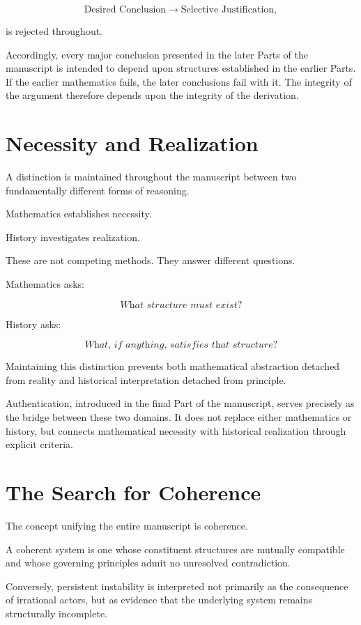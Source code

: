 \documentclass[11pt,openany]{book}
\theoremstyle{plain}
\theoremstyle{definition}
\begin{document}
\[
\boxed{
\text{Desired Conclusion}
\longrightarrow
\text{Selective Justification},
}
\]

is rejected throughout.

Accordingly, every major conclusion presented in the later Parts of the manuscript is intended to depend upon structures established in the earlier Parts. If the earlier mathematics fails, the later conclusions fail with it. The integrity of the argument therefore depends upon the integrity of the derivation.

\section*{Necessity and Realization}

A distinction is maintained throughout the manuscript between two fundamentally different forms of reasoning.

Mathematics establishes necessity.

History investigates realization.

These are not competing methods. They answer different questions.

Mathematics asks:

\[
\textit{What structure must exist?}
\]

History asks:

\[
\textit{What, if anything, satisfies that structure?}
\]

Maintaining this distinction prevents both mathematical abstraction detached from reality and historical interpretation detached from principle.

Authentication, introduced in the final Part of the manuscript, serves precisely as the bridge between these two domains. It does not replace either mathematics or history, but connects mathematical necessity with historical realization through explicit criteria.

\section*{The Search for Coherence}

The concept unifying the entire manuscript is coherence.

A coherent system is one whose constituent structures are mutually compatible and whose governing principles admit no unresolved contradiction.

Conversely, persistent instability is interpreted not primarily as the consequence of irrational actors, but as evidence that the underlying system remains structurally incomplete.
\end{document}

